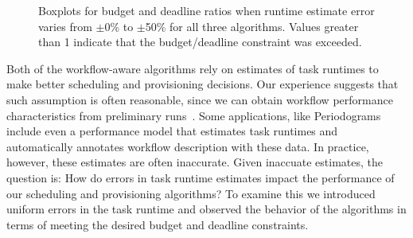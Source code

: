 \documentclass[conference]{IEEEtran}
\begin{document}
\begin{figure}[tb]
    \centering
    \hspace{2cm}
    \caption{Boxplots for budget and deadline ratios when runtime estimate 
    error varies from $\pm$0\% to $\pm$50\% for all three algorithms. Values 
    greater than 1 indicate that the budget/deadline constraint was exceeded.}
    \label{fig:variances}
\end{figure}

Both of the workflow-aware algorithms rely on estimates of task runtimes to make
better scheduling and provisioning decisions. Our experience suggests that such
assumption is often reasonable, since we can obtain workflow performance
characteristics from preliminary runs~\cite{Bharathi2008,Deelman2005,Juve2010}.
Some applications, like Periodograms~\cite{Vockler2011} include even a
performance model that estimates task runtimes and automatically annotates
workflow description with these data. In practice, however, these
estimates are often inaccurate. Given inaccuate estimates, the question is: How
do errors in task runtime estimates impact the performance of our scheduling and
provisioning algorithms?  To examine this we introduced uniform errors in the
task runtime and observed the behavior of the algorithms in terms of meeting the
desired budget and deadline constraints.
\end{document}
